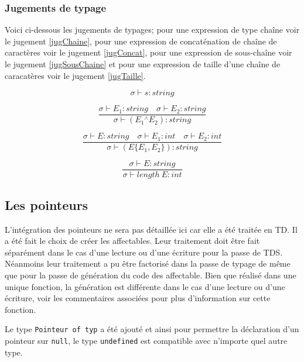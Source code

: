 \documentclass[11pt,a4paper]{article}
\begin{document}
\subsubsection*{Jugements de typage}

Voici ci-dessous les jugements de typages; pour une expression de type chaîne voir le jugement \ref{jugChaine}, pour une expression de concaténation de chaîne de caractères voir le jugement \ref{jugConcat}, pour une expression de sous-chaîne voir le jugement \ref{jugSousChaine} et pour une expression de taille d'une chaîne de caracatères voir le jugement \ref{jugTaille}.

\begin{equation}
	\label{jugChaine}
	\sigma \vdash s : string 
\end{equation}

\begin{equation}
	\label{jugConcat}
	\frac{\sigma \vdash E_1 : string \quad \sigma \vdash E_2 : string}{\sigma \vdash (E_1 {}^\wedge E_2) : string}
\end{equation}

\begin{equation}
	\label{jugSousChaine}
	\frac{\sigma \vdash E : string \quad \sigma \vdash E_1 : int \quad \sigma \vdash E_2 : int}{\sigma \vdash (E\{E_1, E_2\}) : string}
\end{equation}

\begin{equation}
	\label{jugTaille}
	\frac{\sigma \vdash E : string}{\sigma \vdash length ~ E : int}
\end{equation}

\subsection{Les pointeurs}

L'intégration des pointeurs ne sera pas détaillée ici car elle a été traitée en TD. Il a été fait le choix de créer les affectables. Leur traitement doit être fait séparément dans le cas d'une lecture ou d'une écriture pour la passe de TDS. Néanmoins leur traitement a pu être factorisé dans la passe de typage de même que pour la passe de génération du code des affectable. Bien que réalisé dans une unique fonction, la génération est différente dans le cas d'une lecture ou d'une écriture, voir les commentaires associées pour plus d'information sur cette fonction.

Le type \texttt{Pointeur of typ} a été ajouté et ainsi pour permettre la déclaration d'un pointeur sur \texttt{null}, le type \texttt{undefined} est compatible avec n'importe quel autre type.
\end{document}
